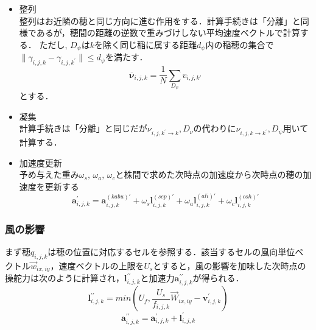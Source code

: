 \documentclass[twocolumn]{jarticle}
\begin{document}
\begin{itemize}
        \item 整列\\
            整列はお近隣の穂と同じ方向に進む作用をする．計算手続きは「分離」と同様であるが，穂間の距離の逆数で重みづけしない平均速度ベクトルで計算する．
            ただし, $D_{\psi}$は$k$を除く同じ稲に属する距離$d_{\psi}$内の稲穂の集合で$\|\gamma_{i,j,k} - \gamma_{i,j,k^{\prime}} \| \leq d_{\psi}$を満たす．
            \[
            \overline{\mathbf{\nu}}_{i,j,k} = \frac{1}{N} \sum_{D_{\psi}} {v}_{i,j,k'}
            \]
            とする．
        \item 凝集\\
        計算手続きは「分離」と同じだが$\nu_{i,j,k^{\prime} \rightarrow k}, D_{\nu}$の代わりに$\nu_{i,j,k \rightarrow k^{\prime}}, D_{\psi}$用いて計算する．
        \item 加速度更新\\
        予め与えた重み$\omega_s, \, \omega_a, \, \omega_c$と株間で求めた次時点の加速度から次時点の穂の加速度を更新する
                \[
                    \mathbf{a}^{\prime}_{i,j,k} = \mathbf{a}^{(kabu)\prime}_{i,j,k} +\omega_s  \mathbf{l}_{i,j,k}^{(sep)\prime} +\omega_a \mathbf{l}_{i,j,k}^{(ali)\prime}+\omega_c  \mathbf{l}_{i,j,k}^{(coh)\prime}
                \]

        \end{itemize}


        \subsubsection{風の影響}
        まず穂$q_{i,j,k}$は穂の位置に対応するセルを参照する．該当するセルの風向単位ベクトル$\vec{w}_{ix,iy}$，速度ベクトルの上限を$U_{s}$とすると，風の影響を加味した次時点の操舵力は次のように計算され，$\mathbf{l}_{i,j,k}^{\prime\prime}$と加速力$\mathbf{a}_{i,j,k}^{\prime\prime}$が得られる．
        \[
        \mathbf{l}_{i,j,k}^{\prime\prime}=min(U_{f},\frac{U_{s}}
        {f_{i,j,k}} \vec{W}_{ix,iy} -\mathbf{v}_{i,j,k}^{\prime})
        \]
        \[
        \mathbf{a}_{i,j,k}^{\prime\prime}= \mathbf{a}_{i,j,k}^{\prime}+\mathbf{l}_{i,j,k}^{\prime}
        \]
\end{document}
